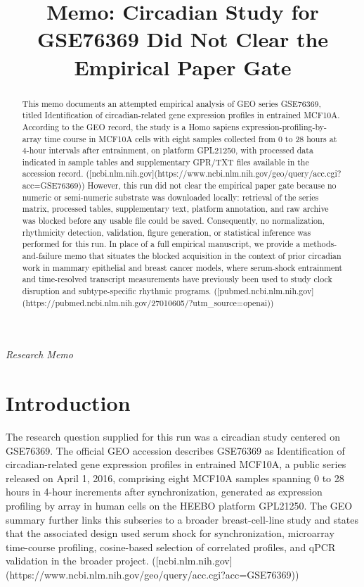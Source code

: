 \documentclass[11pt]{article}
\title{Memo: Circadian Study for GSE76369 Did Not Clear the Empirical Paper Gate}
\author{}
\date{}
\begin{document}
\maketitle

\begin{center}\small\textit{Research Memo}\end{center}

\begin{abstract}

This memo documents an attempted empirical analysis of GEO series GSE76369, titled Identification of circadian-related gene expression profiles in entrained MCF10A. According to the GEO record, the study is a Homo sapiens expression-profiling-by-array time course in MCF10A cells with eight samples collected from 0 to 28 hours at 4-hour intervals after entrainment, on platform GPL21250, with processed data indicated in sample tables and supplementary GPR/TXT files available in the accession record. ([ncbi.nlm.nih.gov](https://www.ncbi.nlm.nih.gov/geo/query/acc.cgi?acc=GSE76369)) However, this run did not clear the empirical paper gate because no numeric or semi-numeric substrate was downloaded locally: retrieval of the series matrix, processed tables, supplementary text, platform annotation, and raw archive was blocked before any usable file could be saved. Consequently, no normalization, rhythmicity detection, validation, figure generation, or statistical inference was performed for this run. In place of a full empirical manuscript, we provide a methods-and-failure memo that situates the blocked acquisition in the context of prior circadian work in mammary epithelial and breast cancer models, where serum-shock entrainment and time-resolved transcript measurements have previously been used to study clock disruption and subtype-specific rhythmic programs. ([pubmed.ncbi.nlm.nih.gov](https://pubmed.ncbi.nlm.nih.gov/27010605/?utm\_source=openai))

\end{abstract}

\section{Introduction}
The research question supplied for this run was a circadian study centered on GSE76369. The official GEO accession describes GSE76369 as Identification of circadian-related gene expression profiles in entrained MCF10A, a public series released on April 1, 2016, comprising eight MCF10A samples spanning 0 to 28 hours in 4-hour increments after synchronization, generated as expression profiling by array in human cells on the HEEBO platform GPL21250. The GEO summary further links this subseries to a broader breast-cell-line study and states that the associated design used serum shock for synchronization, microarray time-course profiling, cosine-based selection of correlated profiles, and qPCR validation in the broader project. ([ncbi.nlm.nih.gov](https://www.ncbi.nlm.nih.gov/geo/query/acc.cgi?acc=GSE76369))
\end{document}
